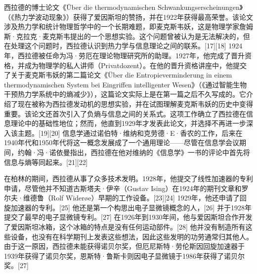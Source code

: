 西拉德的博士论文《Über die thermodynamischen Schwankungserscheinungen》（《热力学波动现象》）获得了爱因斯坦的赞扬，并在1922年获得最高荣誉。该论文涉及热力学和统计物理哲学中的一个长期难题，即麦克斯韦妖，这是物理学家詹姆斯·克拉克·麦克斯韦提出的一个思想实验。这个问题曾被认为是无法解决的，但在处理这个问题时，西拉德认识到热力学与信息理论之间的联系。[17][18] 1924年，西拉德被任命为冯·劳厄在理论物理研究所的助理。1927年，他完成了晋升资格，并成为物理学的私人讲师（Privatdozent）。在他的晋升资格讲座中，他提交了关于麦克斯韦妖的第二篇论文《Über die Entropieverminderung in einem thermodynamischen System bei Eingriffen intelligenter Wesen》（《通过智能生物干预热力学系统中的熵减少》），这篇论文实际上是在第一篇之后不久写成的。它介绍了现在被称为西拉德发动机的思想实验，并在试图理解麦克斯韦妖的历史中变得重要。该论文还首次引入了负熵与信息之间的关系式。这项工作确立了西拉德在信息理论中的基础性地位；然而，他直到1929年才发表此论文，并选择不再进一步深入该主题。[19][20] 信息学通过诺伯特·维纳和克劳德·E·香农的工作，后来在1940年代和1950年代将这一概念发展成了一个通用理论——尽管在信息学会议期间，约翰·冯·诺依曼指出，西拉德在他对维纳的《信息学》一书的评论中首先将信息与熵等同起来。[21][22]

在柏林的期间，西拉德从事了众多技术发明。1928年，他提交了线性加速器的专利申请，尽管他并不知道古斯塔夫·伊辛（Gustav Ising）在1924年的期刊文章和罗尔夫·维德鲁（Rolf Widerøe）早期的工作设备。[23][24] 1929年，他还申请了回旋加速器的专利。[25] 他还是第一个构思出电子显微镜概念的人，[26] 并于1928年提交了最早的电子显微镜专利。[27] 在1926年到1930年间，他与爱因斯坦合作开发了爱因斯坦冰箱，这个冰箱的特点是没有任何运动部件。[28] 他并没有制造所有这些设备，也没有在科学期刊上发表这些想法，因此这些发明的功劳通常归其他人。由于这一原因，西拉德未能获得诺贝尔奖，但厄尼斯特·劳伦斯因回旋加速器于1939年获得了诺贝尔奖，恩斯特·鲁斯卡则因电子显微镜于1986年获得了诺贝尔奖。[27]